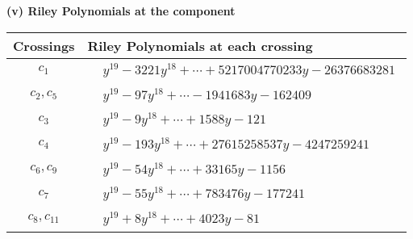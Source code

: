 \documentclass[1p]{elsarticle_modified}
\theoremstyle{definition}
\begin{document}
\newpage\renewcommand{\arraystretch}{1}
\flushleft \textbf{(v) Riley Polynomials at the component}\newline \\
\begin{tabular}{m{50pt}|m{274pt}}
Crossings & \hspace{64pt}Riley Polynomials at each crossing \\
\hline $$\begin{aligned}c_{1}\end{aligned}$$&$\begin{aligned}
&y^{19}-3221 y^{18}+\cdots+5217004770233 y-26376683281
\end{aligned}$\\
\hline $$\begin{aligned}c_{2},c_{5}\end{aligned}$$&$\begin{aligned}
&y^{19}-97 y^{18}+\cdots-1941683 y-162409
\end{aligned}$\\
\hline $$\begin{aligned}c_{3}\end{aligned}$$&$\begin{aligned}
&y^{19}-9 y^{18}+\cdots+1588 y-121
\end{aligned}$\\
\hline $$\begin{aligned}c_{4}\end{aligned}$$&$\begin{aligned}
&y^{19}-193 y^{18}+\cdots+27615258537 y-4247259241
\end{aligned}$\\
\hline $$\begin{aligned}c_{6},c_{9}\end{aligned}$$&$\begin{aligned}
&y^{19}-54 y^{18}+\cdots+33165 y-1156
\end{aligned}$\\
\hline $$\begin{aligned}c_{7}\end{aligned}$$&$\begin{aligned}
&y^{19}-55 y^{18}+\cdots+783476 y-177241
\end{aligned}$\\
\hline $$\begin{aligned}c_{8},c_{11}\end{aligned}$$&$\begin{aligned}
&y^{19}+8 y^{18}+\cdots+4023 y-81
\end{aligned}$\\

\end{tabular}
\end{document}
